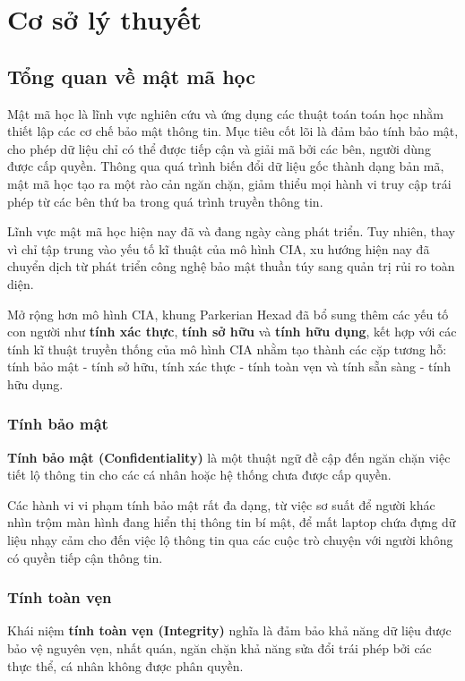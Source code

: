 \chapter{Cơ sở lý thuyết}

\section{Tổng quan về mật mã học}
Mật mã học là lĩnh vực nghiên cứu và ứng dụng các thuật toán toán học nhằm thiết lập các cơ chế bảo mật thông tin. Mục tiêu cốt lõi là đảm bảo tính bảo mật, cho phép dữ liệu chỉ có thể được tiếp cận và giải mã bởi các bên, người dùng được cấp quyền. Thông qua quá trình biến đổi dữ liệu gốc thành dạng bản mã, mật mã học tạo ra một rào cản ngăn chặn, giảm thiểu mọi hành vi truy cập trái phép từ các bên thứ ba trong quá trình truyền thông tin. \nocite{ibm_2023_cryptography}

Lĩnh vực mật mã học hiện nay đã và đang ngày càng phát triển. Tuy nhiên, thay vì chỉ tập trung vào yếu tố kĩ thuật của mô hình CIA, xu hướng hiện nay đã chuyển dịch từ phát triển công nghệ bảo mật thuần túy sang quản trị rủi ro toàn diện. \nocite{pender-bey_2012}

Mở rộng hơn mô hình CIA, khung Parkerian Hexad đã bổ sung thêm các yếu tố con người như \textbf{tính xác thực}, \textbf{tính sở hữu} và \textbf{tính hữu dụng}, kết hợp với các tính kĩ thuật truyền thống của mô hình CIA nhằm tạo thành các cặp tương hỗ: tính bảo mật - tính sở hữu, tính xác thực - tính toàn vẹn và tính sẵn sàng - tính hữu dụng.

\subsection{Tính bảo mật}
\textbf{Tính bảo mật (Confidentiality)} là một thuật ngữ đề cập đến ngăn chặn việc tiết lộ thông tin cho các cá nhân hoặc hệ thống chưa được cấp quyền. 

Các hành vi vi phạm tính bảo mật rất đa dạng, từ việc sơ suất để người khác nhìn trộm màn hình đang hiển thị thông tin bí mật, để mất laptop chứa đựng dữ liệu nhạy cảm cho đến việc lộ thông tin qua các cuộc trò chuyện với người không có quyền tiếp cận thông tin. \nocite{hon_keung_2013} 

\subsection{Tính toàn vẹn}
Khái niệm \textbf{tính toàn vẹn (Integrity)} nghĩa là đảm bảo khả năng dữ liệu được bảo vệ nguyên vẹn, nhất quán, ngăn chặn khả năng sửa đổi trái phép bởi các thực thể, cá nhân không được phân quyền.

